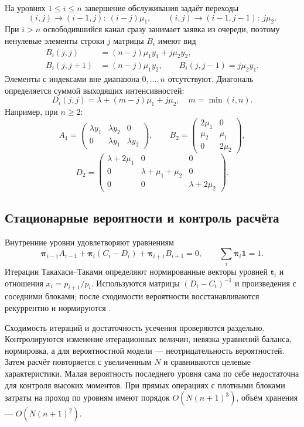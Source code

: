 \documentclass[a4paper,12pt]{article}
\begin{document}
На уровнях \(1\le i\le n\) завершение обслуживания задаёт переходы
\[
(i,j)\to(i-1,j):\ (i-j)\mu_1,\qquad
(i,j)\to(i-1,j-1):\ j\mu_2.
\]
При \(i>n\) освободившийся канал сразу занимает заявка из очереди, поэтому ненулевые элементы строки \(j\) матрицы \(B_i\) имеют вид
\begin{align*}
B_i(j,j)&=(n-j)\mu_1y_1+j\mu_2y_2,\\
B_i(j,j+1)&=(n-j)\mu_1y_2,\qquad
B_i(j,j-1)=j\mu_2y_1.
\end{align*}
Элементы с индексами вне диапазона \(0,\ldots,n\) отсутствуют. Диагональ определяется суммой выходящих интенсивностей:
\[
D_i(j,j)=\lambda+(m-j)\mu_1+j\mu_2,\quad m=\min(i,n).
\]
Например, при \(n\ge2\):
\[
A_1=\begin{pmatrix}\lambda y_1&\lambda y_2&0\\0&\lambda y_1&\lambda y_2\end{pmatrix},\qquad
B_2=\begin{pmatrix}2\mu_1&0\\\mu_2&\mu_1\\0&2\mu_2\end{pmatrix},
\]
\[
D_2=\begin{pmatrix}\lambda+2\mu_1&0&0\\0&\lambda+\mu_1+\mu_2&0\\0&0&\lambda+2\mu_2\end{pmatrix}.
\]

\subsection{Стационарные вероятности и контроль расчёта}
Внутренние уровни удовлетворяют уравнениям
\[
\boldsymbol\pi_{i-1}A_{i-1}+\boldsymbol\pi_i(C_i-D_i)+\boldsymbol\pi_{i+1}B_{i+1}=0,
\qquad \sum_i\boldsymbol\pi_i\mathbf1=1.
\]
Итерации Такахаси--Таками определяют нормированные векторы уровней \(\boldsymbol t_i\) и отношения \(x_i=p_{i+1}/p_i.\) Используются матрицы \((D_i-C_i)^{-1}\) и произведения с соседними блоками; после сходимости вероятности восстанавливаются рекуррентно и нормируются \cite{takahashi1976,ryzhikov2018ru}.

Сходимость итераций и достаточность усечения проверяются раздельно. Контролируются изменение итерационных величин, невязка уравнений баланса, нормировка, а для вероятностной модели --- неотрицательность вероятностей. Затем расчёт повторяется с увеличенным \(N\) и сравниваются целевые характеристики. Малая вероятность последнего уровня сама по себе недостаточна для контроля высоких моментов. При прямых операциях с плотными блоками затраты на проход по уровням имеют порядок \(O(N(n+1)^3)\), объём хранения --- \(O(N(n+1)^2).\)
\end{document}
